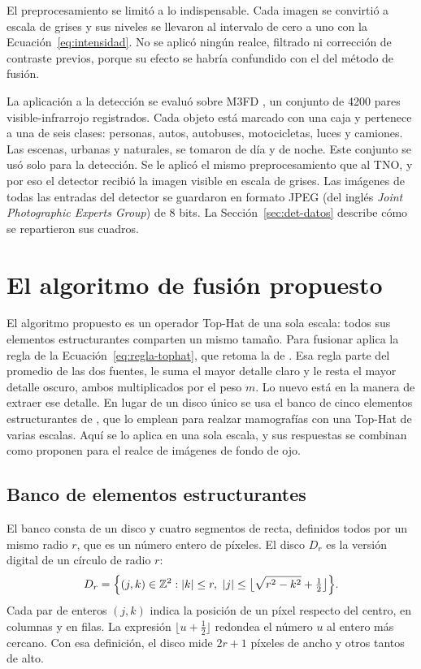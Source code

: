 El preprocesamiento se limitó a lo indispensable. Cada imagen se convirtió a escala de grises y sus
niveles se llevaron al intervalo de cero a uno con la Ecuación~\eqref{eq:intensidad}. No se aplicó
ningún realce, filtrado ni corrección de contraste previos, porque su efecto se habría confundido con el
del método de fusión.

La aplicación a la detección se evaluó sobre M3FD \parencite{liu2022}, un conjunto de 4200 pares
visible-infrarrojo registrados. Cada objeto está marcado con una caja y pertenece a una de seis clases:
personas, autos, autobuses, motocicletas, luces y camiones. Las escenas, urbanas y naturales, se tomaron
de día y de noche. Este conjunto se usó solo para la detección. Se le aplicó el mismo preprocesamiento
que al TNO, y por eso el detector recibió la imagen visible en escala de grises. Las imágenes de todas las entradas del detector
se guardaron en formato JPEG (del inglés \textit{Joint Photographic Experts Group}) de 8 bits. La
Sección~\ref{sec:det-datos} describe cómo se repartieron sus cuadros.

\section{El algoritmo de fusión propuesto}
\label{sec:propuesta}

El algoritmo propuesto es un operador Top-Hat de una sola escala: todos sus elementos estructurantes
comparten un mismo tamaño. Para fusionar aplica la regla de la Ecuación~\eqref{eq:regla-tophat}, que
retoma la de \textcite{ortegarodriguez2025}. Esa regla parte del promedio de las dos fuentes, le suma el mayor
detalle claro y le resta el mayor detalle oscuro, ambos multiplicados por el peso $m$. Lo nuevo está en
la manera de extraer ese detalle. En lugar de un disco único se usa el banco de cinco elementos
estructurantes de \textcite{floressf}, que lo emplean para realzar mamografías con una Top-Hat de varias
escalas. Aquí se lo aplica en una sola escala, y sus respuestas se combinan como proponen
\textcite{bala2024} para el realce de imágenes de fondo de ojo.

\subsection{Banco de elementos estructurantes}

El banco consta de un disco y cuatro segmentos de recta, definidos todos por un mismo radio $r$, que es
un número entero de píxeles. El disco $D_r$ es la versión digital de un círculo de radio $r$:
\begin{equation} D_r = \Bigl\{ (j,k) \in \mathbb{Z}^2 : |k| \le r,\ |j| \le \bigl\lfloor \sqrt{r^2 - k^2} + \tfrac{1}{2} \bigr\rfloor \Bigr\}. \label{eq:disco} \end{equation}
Cada par de enteros $(j,k)$ indica la posición de un píxel respecto del centro, en columnas y en filas.
La expresión $\lfloor u + \tfrac{1}{2} \rfloor$ redondea el número $u$ al entero más cercano. Con esa
definición, el disco mide $2r+1$ píxeles de ancho y otros tantos de alto.

